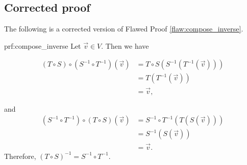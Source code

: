 \clearpage
\subsection{Corrected proof}

The following is a corrected version of Flawed Proof \ref{flaw:compose_inverse}. %

\begin{prf}{prf:compose_inverse} %
Let $\vec{v}\in V$. Then we have

\begin{align*}
    (T \circ S) \circ (S^{-1} \circ T^{-1})(\vec{v})
    &= T \circ S(S^{-1}(T^{-1}(\vec{v}))) \\
    &= T (T^{-1}(\vec{v}))\\
    &= \vec{v},
\end{align*}

and
\begin{align*}
    (S^{-1} \circ T^{-1}) \circ (T \circ S)(\vec{v})
    &= S^{-1} \circ T^{-1}(T( S(\vec{v}))) \\
    &= S^{-1}( S(\vec{v}))\\
    &= \vec{v}.
\end{align*}
Therefore, $(T \circ S)^{-1} = S^{-1} \circ T^{-1}$.
\end{prf} 